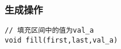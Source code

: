 \subsubsection{生成操作}
\begin{lstlisting}
// 填充区间中的值为val_a
void fill(first,last,val_a)
\end{lstlisting}
